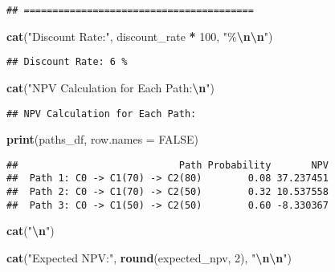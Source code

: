 \documentclass[
]{article}
\newenvironment{Shaded}{\begin{snugshade}}{\end{snugshade}}
\newcommand{\AttributeTok}[1]{\textcolor[rgb]{0.13,0.29,0.53}{#1}}
\newcommand{\ConstantTok}[1]{\textcolor[rgb]{0.56,0.35,0.01}{#1}}
\newcommand{\DecValTok}[1]{\textcolor[rgb]{0.00,0.00,0.81}{#1}}
\newcommand{\FunctionTok}[1]{\textcolor[rgb]{0.13,0.29,0.53}{\textbf{#1}}}
\newcommand{\NormalTok}[1]{#1}
\newcommand{\SpecialCharTok}[1]{\textcolor[rgb]{0.81,0.36,0.00}{\textbf{#1}}}
\newcommand{\StringTok}[1]{\textcolor[rgb]{0.31,0.60,0.02}{#1}}
\begin{document}
\begin{verbatim}
## ========================================
\end{verbatim}

\begin{Shaded}
\begin{Highlighting}[]
\FunctionTok{cat}\NormalTok{(}\StringTok{"Discount Rate:"}\NormalTok{, discount\_rate }\SpecialCharTok{*} \DecValTok{100}\NormalTok{, }\StringTok{"\%}\SpecialCharTok{\textbackslash{}n\textbackslash{}n}\StringTok{"}\NormalTok{)}
\end{Highlighting}
\end{Shaded}

\begin{verbatim}
## Discount Rate: 6 %
\end{verbatim}

\begin{Shaded}
\begin{Highlighting}[]
\FunctionTok{cat}\NormalTok{(}\StringTok{"NPV Calculation for Each Path:}\SpecialCharTok{\textbackslash{}n}\StringTok{"}\NormalTok{)}
\end{Highlighting}
\end{Shaded}

\begin{verbatim}
## NPV Calculation for Each Path:
\end{verbatim}

\begin{Shaded}
\begin{Highlighting}[]
\FunctionTok{print}\NormalTok{(paths\_df, }\AttributeTok{row.names =} \ConstantTok{FALSE}\NormalTok{)}
\end{Highlighting}
\end{Shaded}

\begin{verbatim}
##                            Path Probability       NPV
##  Path 1: C0 -> C1(70) -> C2(80)        0.08 37.237451
##  Path 2: C0 -> C1(70) -> C2(50)        0.32 10.537558
##  Path 3: C0 -> C1(50) -> C2(50)        0.60 -8.330367
\end{verbatim}

\begin{Shaded}
\begin{Highlighting}[]
\FunctionTok{cat}\NormalTok{(}\StringTok{"}\SpecialCharTok{\textbackslash{}n}\StringTok{"}\NormalTok{)}
\end{Highlighting}
\end{Shaded}

\begin{Shaded}
\begin{Highlighting}[]
\FunctionTok{cat}\NormalTok{(}\StringTok{"Expected NPV:"}\NormalTok{, }\FunctionTok{round}\NormalTok{(expected\_npv, }\DecValTok{2}\NormalTok{), }\StringTok{"}\SpecialCharTok{\textbackslash{}n\textbackslash{}n}\StringTok{"}\NormalTok{)}
\end{Highlighting}
\end{Shaded}
\end{document}

